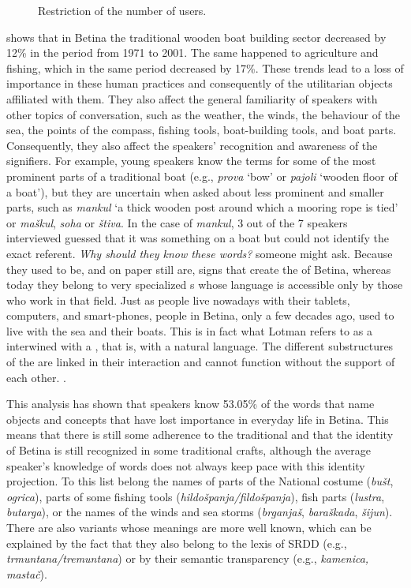\documentclass[output=paper]{LSP/langsci}
\begin{document}
\begin{figure}[p]


	\caption{Restriction of the number of users.}
\label{fig:3}
\end{figure}
 shows that in Betina the traditional wooden boat building sector decreased by 12\% in the period from 1971 to 2001. The same happened to agriculture and fishing, which in the same period decreased by 17\%. These trends lead to a loss of importance in these human practices and consequently of the utilitarian objects affiliated with them. They also affect the general familiarity of speakers with other topics of conversation, such as the weather, the winds, the behaviour of the sea, the points of the compass, fishing tools, boat-building tools, and boat parts. Consequently, they also affect the speakers’ recognition and awareness of the signifiers. For example, young speakers know the terms for some of the most prominent parts of a traditional boat (e.g.,  \textit{prova} `bow' or \textit{pajoli} `wooden floor of a boat'), but they are uncertain when asked about less prominent and smaller parts, such as \textit{mankul} `a thick wooden post around which a mooring rope is tied' or \textit{maškul}, \textit{soha} or \textit{štiva}. In the case of \textit{mankul}, 3 out of the 7 speakers interviewed guessed that it was something on a boat but could not identify the exact referent. \textit{Why should they know these words?} someone might ask. Because they used to be, and on paper still are, signs that create the  of Betina, whereas today they belong to very specialized s whose language is accessible only by those who work in that field. Just as people live nowadays with their tablets, computers, and smart-phones, people in Betina, only a few decades ago, used to live with the sea and their boats. This is in fact what Lotman refers to as a  interwined with a , that is, with a natural language. The different substructures of the  are linked in their interaction and cannot function without the support of each other. \citep[219]{lotman_semiosphere_1985}.






This analysis has shown that speakers know 53.05\% of the words that name objects and concepts that have lost importance in everyday life in Betina. This means that there is still some adherence to the traditional and that the identity of Betina is still recognized in some traditional crafts, although the average speaker’s knowledge of words does not always keep pace with this identity projection. To this list belong the names of parts of the National costume (\textit{bušt}, \textit{ogrica}), parts of some fishing tools (\textit{hildošpanja/fildošpanja}), fish parts (\textit{lustra}, \textit{butarga}), or the names of the winds and sea storms (\textit{brganjaš}, \textit{baraškada}, \textit{šijun}). There are also variants whose meanings are more well known, which can be explained by the fact that they also belong to the lexis of SRDD (e.g., \textit{trmuntana/tremuntana}) or by their semantic transparency (e.g., \textit{kamenica, mastač}). 
\end{document}
